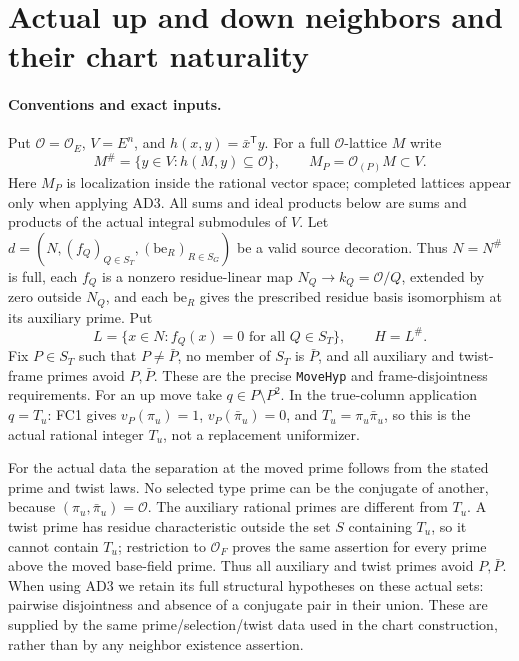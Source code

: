 \section{Actual up and down neighbors and their chart naturality}
\label{sec:neighbor-geometry}


\paragraph{Conventions and exact inputs.}
Put $\mathcal O=\mathcal O_E$, $V=E^n$, and
$h(x,y)=\bar x^{\mathsf T}y$. For a full $\mathcal O$-lattice $M$ write
\[
 M^\#=\{y\in V:h(M,y)\subseteq\mathcal O\},\qquad
 M_P=\mathcal O_{(P)}M\subset V.
\]
Here $M_P$ is localization inside the rational vector space; completed
lattices appear only when applying AD3. All sums and ideal products
below are sums and products of the actual integral submodules of $V$.
Let $d=(N,(f_Q)_{Q\in S_T},(\mathrm{be}_R)_{R\in S_G})$ be a valid
source decoration. Thus $N=N^\#$ is full, each $f_Q$ is a nonzero
residue-linear map $N_Q\to k_Q=\mathcal O/Q$, extended by zero outside
$N_Q$, and each $\mathrm{be}_R$ gives the prescribed residue basis
isomorphism at its auxiliary prime. Put
\[
 L=\{x\in N:f_Q(x)=0\text{ for all }Q\in S_T\},\qquad H=L^\#.
\]
Fix $P\in S_T$ such that $P\ne\bar P$, no member of $S_T$ is $\bar P$,
and all auxiliary and twist-frame primes avoid $P,\bar P$. These are
the precise \texttt{MoveHyp} and frame-disjointness requirements.
For an up move take $q\in P\setminus P^2$. In the true-column application
$q=T_u$: FC1 gives $v_P(\pi_u)=1$, $v_P(\bar\pi_u)=0$, and
$T_u=\pi_u\bar\pi_u$, so this is the actual rational integer $T_u$,
not a replacement uniformizer.

For the actual data the separation at the moved prime follows from
the stated prime and twist laws. No selected type prime can be the
conjugate of another, because $(\pi_u,\bar\pi_u)=\mathcal O$.
The auxiliary rational primes are different from $T_u$. A twist
prime has residue characteristic outside the set $S$ containing
$T_u$, so it cannot contain $T_u$; restriction to $\mathcal O_F$
proves the same assertion for every prime above the moved base-field
prime. Thus all auxiliary and twist primes avoid $P,\bar P$.
When using AD3 we retain its full structural hypotheses on these
actual sets: pairwise disjointness and absence of a conjugate pair
in their union. These are supplied by the same prime/selection/twist
data used in the chart construction, rather than by any neighbor
existence assertion.

